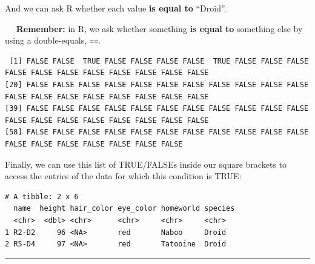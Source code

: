 \documentclass[]{book}
\newenvironment{Shaded}{\begin{snugshade}}{\end{snugshade}}
\newcommand{\CommentTok}[1]{\textcolor[rgb]{0.56,0.35,0.01}{\textit{#1}}}
\newcommand{\NormalTok}[1]{#1}
\newcommand{\OperatorTok}[1]{\textcolor[rgb]{0.81,0.36,0.00}{\textbf{#1}}}
\newcommand{\StringTok}[1]{\textcolor[rgb]{0.31,0.60,0.02}{#1}}
\begin{document}
And we can ask R whether each value \textbf{is equal to} ``Droid''.

~~ \textbf{Remember:} in R, we ask whether something \textbf{is equal to} something else by using a double-equals, \texttt{==}.

\begin{Shaded}
\end{Shaded}

\begin{verbatim}
 [1] FALSE FALSE  TRUE FALSE FALSE FALSE FALSE  TRUE FALSE FALSE FALSE FALSE FALSE FALSE FALSE FALSE FALSE FALSE FALSE
[20] FALSE FALSE FALSE FALSE FALSE FALSE FALSE FALSE FALSE FALSE FALSE FALSE FALSE FALSE FALSE FALSE FALSE FALSE FALSE
[39] FALSE FALSE FALSE FALSE FALSE FALSE FALSE FALSE FALSE FALSE FALSE FALSE FALSE FALSE FALSE FALSE FALSE FALSE FALSE
[58] FALSE FALSE FALSE FALSE FALSE FALSE FALSE FALSE FALSE FALSE FALSE FALSE FALSE FALSE FALSE FALSE FALSE FALSE
\end{verbatim}

Finally, we can use this list of TRUE/FALSEs inside our square brackets to access the entries of the data for which this condition is TRUE:

\begin{Shaded}
\end{Shaded}

\begin{verbatim}
# A tibble: 2 x 6
  name  height hair_color eye_color homeworld species
  <chr>  <dbl> <chr>      <chr>     <chr>     <chr>  
1 R2-D2     96 <NA>       red       Naboo     Droid  
2 R5-D4     97 <NA>       red       Tatooine  Droid  
\end{verbatim}

\begin{center}\rule{0.5\linewidth}{0.5pt}\end{center}
\end{document}
